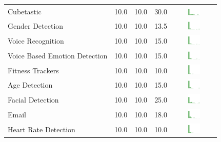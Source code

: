 \begin{table}[t]
\begin{center}
\begin{tabular}{| p{2cm} | p{1cm} | p{1cm} | p{1cm} | c |}
Cubetastic & 10.0 & 10.0 & 30.0 & \includegraphics[width = 2cm, height = 0.5cm]{tex-inputs/table-images/cubetasticrisk} \\ 
Gender Detection & 10.0 & 10.0 & 13.5 & \includegraphics[width = 2cm, height = 0.5cm]{tex-inputs/table-images/genderdetectionrisk} \\ 
Voice Recognition & 10.0 & 10.0 & 15.0 & \includegraphics[width = 2cm, height = 0.5cm]{tex-inputs/table-images/voicerecognitionrisk} \\ 
Voice Based Emotion Detection & 10.0 & 10.0 & 15.0 & \includegraphics[width = 2cm, height = 0.5cm]{tex-inputs/table-images/voicebasedemotiondetectionrisk} \\ 
Fitness Trackers & 10.0 & 10.0 & 10.0 & \includegraphics[width = 2cm, height = 0.5cm]{tex-inputs/table-images/fitnesstrackersrisk} \\ 
Age Detection & 10.0 & 10.0 & 15.0 & \includegraphics[width = 2cm, height = 0.5cm]{tex-inputs/table-images/agedetectionrisk} \\ 
Facial Detection & 10.0 & 10.0 & 25.0 & \includegraphics[width = 2cm, height = 0.5cm]{tex-inputs/table-images/facialdetectionrisk} \\ 
Email & 10.0 & 10.0 & 18.0 & \includegraphics[width = 2cm, height = 0.5cm]{tex-inputs/table-images/emailrisk} \\ 
Heart Rate Detection & 10.0 & 10.0 & 10.0 & \includegraphics[width = 2cm, height = 0.5cm]{tex-inputs/table-images/heartratedetectionrisk} \\ 

\end{tabular}
\end{center}
\end{table}
